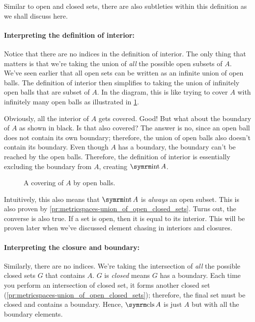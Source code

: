Similar to open and closed sets, there are also subtleties within this definition as
we shall discuss here.

\paragraph{Interpreting the definition of interior:}

Notice that there are no indices in the definition of interior. The only thing that
matters is that we're taking the union of \emph{all} the possible open subsets of
\(A\). We've seen earlier that all open sets can be written as an infinite union of
open balls. The definition of interior then simplifies to taking the union of infinitely
open balls that are subset of \(A\). In the diagram, this is like trying to cover \(A\)
with infinitely many open balls as illustrated in \cref{fig:metricspaces-interiors-1}.

Obviously, all the interior of \(A\) gets covered. Good! But what about the boundary of
\(A\) as shown in black. Is that also covered? The answer is no, since an open ball does
not contain its own boundary; therefore, the union of open balls also doesn't contain its boundary.
Even though \(A\) has a boundary, the boundary can't be reached by the open balls. Therefore,
the definition of interior is essentially excluding the boundary from \(A\), creating \(\intr A\).

\begin{figure}[ht]
  \centering
  
  \caption{A covering of \(A\) by open balls.}
  \label{fig:metricspaces-interiors-1}
\end{figure}

Intuitively, this also means that \(\intr A\) is \emph{always} an open subset. This is
also proven by \cref{pr:metricspaces-union_of_open_closed_sets}. Turns out, the converse
is also true. If a set is open, then it is equal to its interior. This will be proven
later when we've discussed element chasing in interiors and closures.

\paragraph{Interpreting the closure and boundary:}

Similarly, there are no indices. We're taking the intersection of \emph{all} the
possible closed sets \(G\) that contains \(A\). \(G\) is \emph{closed} means \(G\) has
a boundary. Each time you perform an intersection of closed set, it forms another closed
set (\cref{pr:metricspaces-union_of_open_closed_sets}); therefore, the final set must be
closed and contains a boundary. Hence, \(\clos A\) is just \(A\) but with all the boundary elements.

